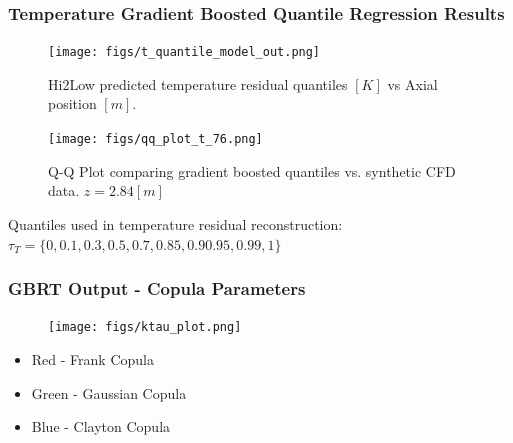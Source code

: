 \documentclass[t, pdftex]{beamer}
\begin{document}
\begin{frame}\frametitle{Temperature Gradient Boosted Quantile Regression Results}
    \begin{figure}
        \centering
        \begin{minipage}{.5\textwidth}
            \centering
            \texttt{[image: figs/t\_quantile\_model\_out.png]}
            \caption{Hi2Low predicted temperature residual quantiles $[K]$ vs Axial position $[m]$.}
        \end{minipage}%
        \begin{minipage}{.5\textwidth}
            \centering
            \texttt{[image: figs/qq\_plot\_t\_76.png]}
            \caption{Q-Q Plot comparing gradient boosted quantiles vs. synthetic CFD data. $z=2.84[m]$}
        \end{minipage}
    \end{figure}
Quantiles used in temperature residual reconstruction: $\tau_{T}=\{0, 0.1, 0.3, 0.5, 0.7, 0.85, 0.9 0.95, 0.99, 1\}$
\end{frame}

\begin{frame}\frametitle{GBRT Output - Copula Parameters}
\begin{figure}[!htbp]
\centering
\texttt{[image: figs/ktau\_plot.png]}
\label{model_overview}
\end{figure}
\begin{itemize}
\item Red - Frank Copula
\item Green - Gaussian Copula
\item Blue - Clayton Copula
\end{itemize}
\end{frame}



\end{document}

